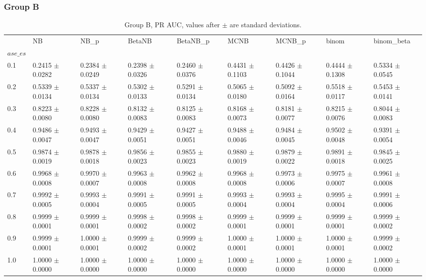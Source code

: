 \subsubsection*{Group B}
\begin{table}[H]
\centering
\begin{adjustbox}{max width=\linewidth}
\begin{tabular}{lllllllll}
\toprule
 & NB & NB\_p & BetaNB & BetaNB\_p & MCNB & MCNB\_p & binom & binom\_beta \\
$ase\_es$ &  &  &  &  &  &  &  &  \\
\midrule
0.1 & 0.2415 $\pm$ 0.0282 & 0.2384 $\pm$ 0.0249 & 0.2398 $\pm$ 0.0326 & 0.2460 $\pm$ 0.0376 & 0.4431 $\pm$ 0.1103 & 0.4426 $\pm$ 0.1044 & 0.4444 $\pm$ 0.1308 & 0.5334 $\pm$ 0.0545 \\
0.2 & 0.5339 $\pm$ 0.0134 & 0.5337 $\pm$ 0.0134 & 0.5302 $\pm$ 0.0133 & 0.5291 $\pm$ 0.0134 & 0.5065 $\pm$ 0.0180 & 0.5092 $\pm$ 0.0164 & 0.5518 $\pm$ 0.0117 & 0.5453 $\pm$ 0.0141 \\
0.3 & 0.8223 $\pm$ 0.0080 & 0.8228 $\pm$ 0.0080 & 0.8132 $\pm$ 0.0083 & 0.8125 $\pm$ 0.0083 & 0.8168 $\pm$ 0.0073 & 0.8181 $\pm$ 0.0077 & 0.8215 $\pm$ 0.0076 & 0.8044 $\pm$ 0.0083 \\
0.4 & 0.9486 $\pm$ 0.0047 & 0.9493 $\pm$ 0.0047 & 0.9429 $\pm$ 0.0051 & 0.9427 $\pm$ 0.0051 & 0.9488 $\pm$ 0.0046 & 0.9484 $\pm$ 0.0045 & 0.9502 $\pm$ 0.0048 & 0.9391 $\pm$ 0.0054 \\
0.5 & 0.9874 $\pm$ 0.0019 & 0.9878 $\pm$ 0.0018 & 0.9856 $\pm$ 0.0023 & 0.9855 $\pm$ 0.0023 & 0.9880 $\pm$ 0.0019 & 0.9879 $\pm$ 0.0022 & 0.9891 $\pm$ 0.0018 & 0.9845 $\pm$ 0.0025 \\
0.6 & 0.9968 $\pm$ 0.0008 & 0.9970 $\pm$ 0.0007 & 0.9963 $\pm$ 0.0008 & 0.9962 $\pm$ 0.0008 & 0.9968 $\pm$ 0.0008 & 0.9973 $\pm$ 0.0006 & 0.9975 $\pm$ 0.0007 & 0.9961 $\pm$ 0.0008 \\
0.7 & 0.9992 $\pm$ 0.0005 & 0.9993 $\pm$ 0.0004 & 0.9991 $\pm$ 0.0005 & 0.9991 $\pm$ 0.0005 & 0.9993 $\pm$ 0.0004 & 0.9993 $\pm$ 0.0004 & 0.9995 $\pm$ 0.0004 & 0.9991 $\pm$ 0.0006 \\
0.8 & 0.9999 $\pm$ 0.0001 & 0.9999 $\pm$ 0.0001 & 0.9998 $\pm$ 0.0002 & 0.9998 $\pm$ 0.0002 & 0.9999 $\pm$ 0.0001 & 0.9999 $\pm$ 0.0001 & 0.9999 $\pm$ 0.0001 & 0.9999 $\pm$ 0.0002 \\
0.9 & 0.9999 $\pm$ 0.0001 & 1.0000 $\pm$ 0.0001 & 0.9999 $\pm$ 0.0002 & 0.9999 $\pm$ 0.0002 & 1.0000 $\pm$ 0.0001 & 1.0000 $\pm$ 0.0001 & 1.0000 $\pm$ 0.0001 & 0.9999 $\pm$ 0.0002 \\
1.0 & 1.0000 $\pm$ 0.0000 & 1.0000 $\pm$ 0.0000 & 1.0000 $\pm$ 0.0000 & 1.0000 $\pm$ 0.0000 & 1.0000 $\pm$ 0.0000 & 1.0000 $\pm$ 0.0000 & 1.0000 $\pm$ 0.0000 & 1.0000 $\pm$ 0.0000 \\
\bottomrule
\end{tabular}

\end{adjustbox}
\caption{Group B, PR AUC, values after $\pm$ are standard deviations.}
\end{table}


